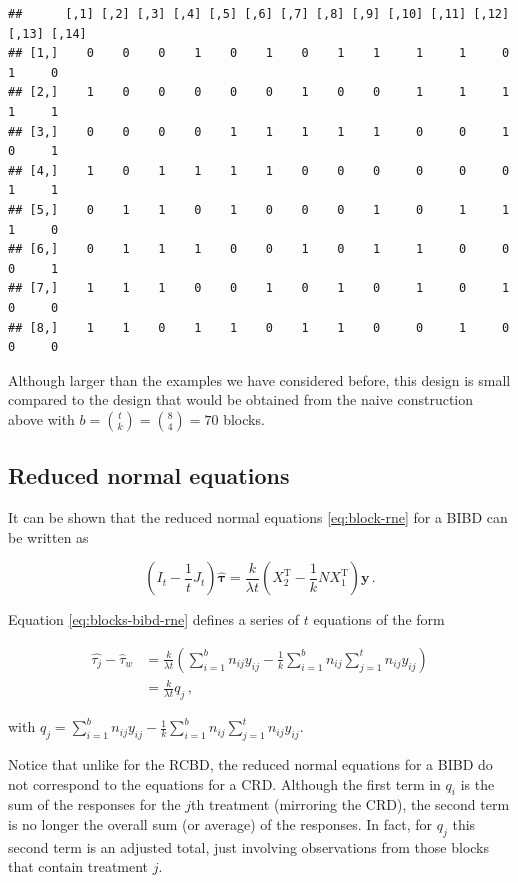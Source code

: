 \documentclass[
]{book}
\theoremstyle{definition}
\theoremstyle{definition}
\theoremstyle{definition}
\theoremstyle{definition}
\theoremstyle{remark}
\begin{document}
\begin{verbatim}
##      [,1] [,2] [,3] [,4] [,5] [,6] [,7] [,8] [,9] [,10] [,11] [,12] [,13] [,14]
## [1,]    0    0    0    1    0    1    0    1    1     1     1     0     1     0
## [2,]    1    0    0    0    0    0    1    0    0     1     1     1     1     1
## [3,]    0    0    0    0    1    1    1    1    1     0     0     1     0     1
## [4,]    1    0    1    1    1    1    0    0    0     0     0     0     1     1
## [5,]    0    1    1    0    1    0    0    0    1     0     1     1     1     0
## [6,]    0    1    1    1    0    0    1    0    1     1     0     0     0     1
## [7,]    1    1    1    0    0    1    0    1    0     1     0     1     0     0
## [8,]    1    1    0    1    1    0    1    1    0     0     1     0     0     0
\end{verbatim}

Although larger than the examples we have considered before, this design is small compared to the design that would be obtained from the naive construction above with \(b = {t \choose k} = {8 \choose 4} = 70\) blocks.

\hypertarget{reduced-normal-equations}{%
\subsection{Reduced normal equations}\label{reduced-normal-equations}}

It can be shown that the reduced normal equations \eqref{eq:block-rne} for a BIBD can be written as

\begin{equation}
\left(I_t - \frac{1}{t}J_t\right)\hat{\boldsymbol{\tau}} = \frac{k}{\lambda t}\left(X_2^{\mathrm{T}} - \frac{1}{k}NX_1^{\mathrm{T}}\right)\boldsymbol{y}\,.
\label{eq:blocks-bibd-rne}
\end{equation}

Equation \eqref{eq:blocks-bibd-rne} defines a series of \(t\) equations of the form

\begin{align*}
\hat{\tau_j} - \hat{\tau}_w & = \frac{k}{\lambda t}\left(\sum_{i = 1}^b n_{ij}y_{ij} - \frac{1}{k}\sum_{i=1}^bn_{ij}\sum_{j=1}^tn_{ij}y_{ij}\right) \\
& = \frac{k}{\lambda t} q_j\,,
\end{align*}

with \(q_j = \sum_{i = 1}^b n_{ij}y_{ij} - \frac{1}{k}\sum_{i=1}^bn_{ij}\sum_{j=1}^tn_{ij}y_{ij}\).

Notice that unlike for the RCBD, the reduced normal equations for a BIBD do not correspond to the equations for a CRD. Although the first term in \(q_i\) is the sum of the responses for the \(j\)th treatment (mirroring the CRD), the second term is no longer the overall sum (or average) of the responses. In fact, for \(q_j\) this second term is an adjusted total, just involving observations from those blocks that contain treatment \(j\).
\end{document}
